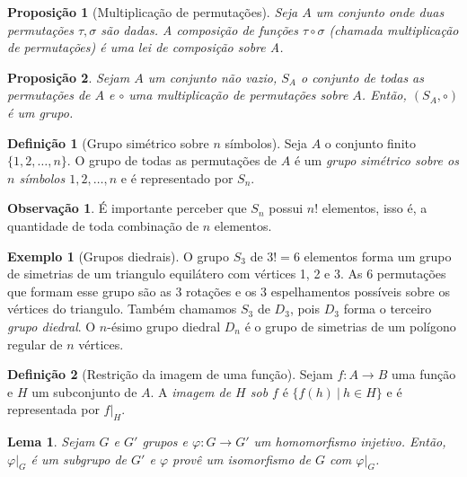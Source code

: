 \documentclass[a4paper,12pt]{report}
\theoremstyle{plain}
\newtheorem{lema}{Lema}[section]
\newtheorem{proposicao}{Proposição}[section]
\theoremstyle{definition}
\newtheorem{definicao}{Definição}[section]
\newtheorem{observacao}{Observação}[section]
\newtheorem{exemplo}{Exemplo}[section]
\begin{document}
\begin{proposicao}[Multiplicação de permutações]\label{def:multpermut}
	Seja $A$ um conjunto onde duas permutações $\tau,\sigma$ são dadas. A composição de funções $\tau\circ\sigma$ (chamada \emph{multiplicação de permutações}) é uma lei de composição sobre A.
\end{proposicao}

\begin{proposicao}
	Sejam $A$ um conjunto não vazio, $S_A$ o conjunto de todas as permutações de $A$ e $\circ$ uma multiplicação de permutações sobre $A$. Então, $(S_A, \circ)$ é um grupo.
\end{proposicao}

\begin{definicao}[Grupo simétrico sobre $n$ símbolos]
	Seja $A$ o conjunto finito $\{1,2,\dots, n\}$. O grupo de todas as permutações de $A$ é um \emph{grupo simétrico sobre os $n$ símbolos $1,2,\dots,n$} e é representado por $S_n$.	
\end{definicao}

\begin{observacao}
	É importante perceber que $S_n$ possui $n!$ elementos, isso é, a quantidade de toda combinação de $n$ elementos.
\end{observacao}

\begin{exemplo}[Grupos diedrais]
	O grupo $S_3$ de $3! = 6$ elementos forma um grupo de simetrias de um triangulo equilátero com vértices 1, 2 e 3. As 6 permutações que formam esse grupo são as 3 rotações e os 3 espelhamentos possíveis sobre os vértices do triangulo. Também chamamos $S_3$ de $D_3$, pois $D_3$ forma o terceiro \emph{grupo diedral}. 
	O $n$-ésimo grupo diedral $D_n$ é o grupo de simetrias de um polígono regular de $n$ vértices.
\end{exemplo}

\begin{definicao}[Restrição da imagem de uma função]
	Sejam $f: A\longrightarrow B$ uma função e $H$ um subconjunto de $A$. A \emph{imagem de $H$ sob $f$} é $\{f(h)\ |\ h \in H\}$ e é representada por $f|_H$.
\end{definicao}

\begin{lema}
	Sejam $G$ e $G'$ grupos e $\varphi:G\longrightarrow G'$ um homomorfismo injetivo. Então, $\varphi|_G$ é um subgrupo de $G'$ e $\varphi$ provê um isomorfismo de $G$ com $\varphi|_G$.
\end{lema}
\end{document}
